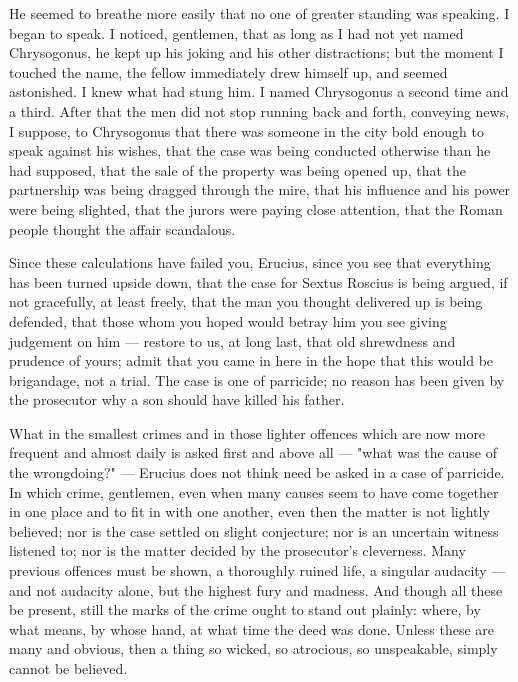  He seemed to breathe more easily that no one of greater standing was speaking. I began to speak. I noticed, gentlemen, that as long as I had not yet named Chrysogonus, he kept up his joking and his other distractions; but the moment I touched the name, the fellow immediately drew himself up, and seemed astonished. I knew what had stung him. I named Chrysogonus a second time and a third. After that the men did not stop running back and forth, conveying news, I suppose, to Chrysogonus that there was someone in the city bold enough to speak against his wishes, that the case was being conducted otherwise than he had supposed, that the sale of the property was being opened up, that the partnership was being dragged through the mire, that his influence and his power were being slighted, that the jurors were paying close attention, that the Roman people thought the affair scandalous.

 Since these calculations have failed you, Erucius, since you see that everything has been turned upside down, that the case for Sextus Roscius is being argued, if not gracefully, at least freely, that the man you thought delivered up is being defended, that those whom you hoped would betray him you see giving judgement on him --- restore to us, at long last, that old shrewdness and prudence of yours; admit that you came in here in the hope that this would be brigandage, not a trial. The case is one of parricide; no reason has been given by the prosecutor why a son should have killed his father.

 What in the smallest crimes and in those lighter offences which are now more frequent and almost daily is asked first and above all --- "what was the cause of the wrongdoing?" --- Erucius does not think need be asked in a case of parricide. In which crime, gentlemen, even when many causes seem to have come together in one place and to fit in with one another, even then the matter is not lightly believed; nor is the case settled on slight conjecture; nor is an uncertain witness listened to; nor is the matter decided by the prosecutor's cleverness. Many previous offences must be shown, a thoroughly ruined life, a singular audacity --- and not audacity alone, but the highest fury and madness. And though all these be present, still the marks of the crime ought to stand out plainly: where, by what means, by whose hand, at what time the deed was done. Unless these are many and obvious, then a thing so wicked, so atrocious, so unspeakable, simply cannot be believed.

